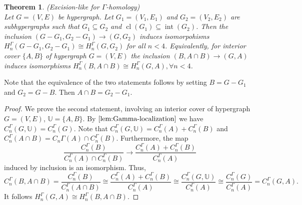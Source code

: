 \documentclass[11pt]{amsart}
\newtheorem{thm}{Theorem}[section]
\newcommand{\cl}{\operatorname{cl}}
\renewcommand{\int}{\operatorname{int}}
\begin{document}
\medskip

\begin{thm}\label{gamma excision}
	(Excision-like for $\Gamma$-homology)\\
	Let $G=(V,E)$ be hypergraph. Let $G_1=(V_1,E_1)$ and $G_2=(V_2,E_2)$ are  subhypergraphs such that $G_1\subseteq G_2$ and $\cl(G_1)\subseteq \int(G_2)$. Then the inclusion $(G-G_1,G_2-G_1)\rightarrow (G,G_2)$ induces isomorpohisms $H_{n}^\Gamma(G-G_1,G_2-G_1)\cong H_{n}^\Gamma(G,G_2)$ for all $n<4$. Equivalently, for interior cover $\{A,B\}$ of hypergraph $G=(V,E)$ the inclusion $(B,A\cap B)\rightarrow (G,A)$ induces isomorphisms $H_{n}^\Gamma(B,A\cap B)\cong H_{n}^\Gamma(G,A), \forall n<4$.
\end{thm}

Note that the equivalence of the two statements follows by setting $B = G-G_1$ and $G_2=G-B$. Then $A\cap B=G_2-G_1$. 

\begin{proof}\label{excision proof}
	We prove the second statement, involving an interior cover of hypergraph $G=(V,E)$, $\mathbb{U}=\{A,B\}$. By $\ref{lem:Gamma-localization}$ we have $C_{n}^\Gamma(G,\mathbb{U})=C_{n}^\Gamma(G)$. Note that $C_{n}^\Gamma(G,\mathbb{U})=C_{n}^\Gamma(A)+C_{n}^\Gamma(B)$ and $C_{n}^\Gamma(A\cap B)=C_{n}\Gamma(A)\cap C_{n}^\Gamma(B)$. Furthermore, the map \[\frac{C_{n}^\Gamma(B)}{C_{n}^\Gamma(A)\cap C_{n}^\Gamma(B)}\rightarrow \frac{C_{n}^\Gamma(A)+C_{n}^\Gamma(B)}{C_{n}^\Gamma(A)}\] induced by inclusion is an isomorphism. Thus,
	\[C_{n}^\Gamma(B,A\cap B)=\frac{C_{n}^\Gamma(B)}{C_{n}^\Gamma(A\cap B)}\cong \frac{C_{n}^\Gamma(A)+C_{n}^\Gamma(B)}{C_{n}^\Gamma(A)}\cong \frac{C_{n}^\Gamma(G,\mathbb{U})}{C_{n}^\Gamma(A)}\cong \frac{C_{n}^\Gamma(G)}{C_{n}^\Gamma(A)}=C_{n}^\Gamma(G,A).\] It follows $H_{n}^\Gamma(G,A)\cong H_{n}^\Gamma(B,A\cap B)$.	
\end{proof}

\medskip
\end{document}
